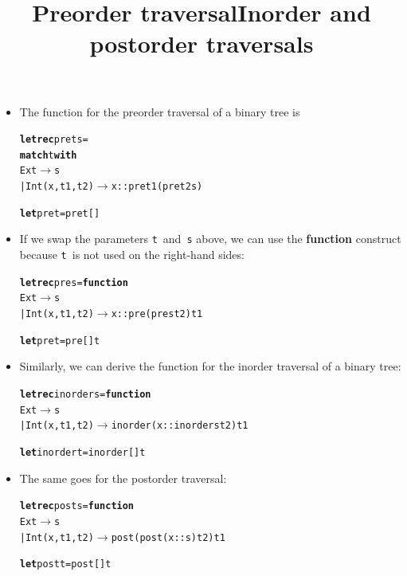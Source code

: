 \documentclass[wide]{slides}
\begin{document}
\begin{slide}
  \title{Preorder traversal}

  \begin{itemize}

    \item The \OCaml function for the preorder traversal of a binary
      tree is
\begin{alltt}
\textbf{let rec} pre t s =
  \textbf{match} t \textbf{with}
                Ext \(\rightarrow\) s
  | Int (x,t1,t2) \(\rightarrow\) x :: pre t1 (pre t2 s)

\textbf{let} pre t = pre t []
\end{alltt}
\smallskip

  \item If we swap the parameters \texttt{t}~and~\texttt{s} above, we
    can use the \textbf{function} construct because \texttt{t}~is not
    used on the right\hyp{}hand sides:
\begin{alltt}
\textbf{let rec} pre s = \textbf{function}
              Ext \(\rightarrow\) s
| Int (x,t1,t2) \(\rightarrow\) x :: pre (pre s t2) t1

\textbf{let} pre t = pre [] t
\end{alltt}

  \end{itemize}

\end{slide}

\begin{slide}
  \title{Inorder and postorder traversals}

  \begin{itemize}

    \item Similarly, we can derive the \OCaml function for the inorder
      traversal of a binary tree:
\begin{alltt}
\textbf{let rec} inorder s = \textbf{function}
              Ext \(\rightarrow\) s
| Int (x,t1,t2) \(\rightarrow\) inorder (x :: inorder s t2) t1

\textbf{let} inorder t = inorder [] t
\end{alltt}
\smallskip

  \item The same goes for the postorder traversal:
\begin{alltt}
\textbf{let rec} post s = \textbf{function}
              Ext \(\rightarrow\) s
| Int (x,t1,t2) \(\rightarrow\) post (post (x::s) t2) t1

\textbf{let} post t = post [] t
\end{alltt}

\end{itemize}

\end{slide}
\end{document}
